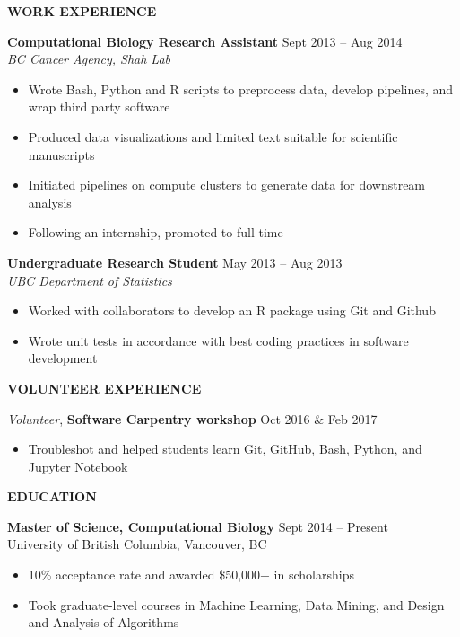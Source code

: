 \documentclass{res}
\renewcommand{\section}[1]{%
  \vspace{0.3in}%
  \centerline{\uppercase{\bf{#1}}}%
  \vspace{-6pt}}
\newcommand{\linehead}[2]{%
  {\bf #1} \hfill #2\\}
\newcommand{\linevolunteer}[3]{%
  {\sl #3}, {\bf #2} \hfill #1}%
\begin{document}
\begin{resume}
\section{Work Experience}

{\bf Computational Biology Research Assistant} \hfill Sept 2013 -- Aug 2014\\
{\it BC Cancer Agency, Shah Lab}
\begin{itemize}
  \item Wrote Bash, Python and R scripts to preprocess data, develop pipelines, and wrap third party software
  \item Produced data visualizations and limited text suitable for scientific manuscripts
  \item Initiated pipelines on compute clusters to generate data for downstream analysis
  \item Following an internship, promoted to full-time
\end{itemize}

{\bf Undergraduate Research Student} \hfill May 2013 -- Aug 2013\\
{\it UBC Department of Statistics}
\begin{itemize}
  \item Worked with collaborators to develop an R package using Git and Github
  \item Wrote unit tests in accordance with best coding practices in software development
\end{itemize}

\section{Volunteer experience}
\linevolunteer{Oct 2016 \& Feb 2017}{%
  Software Carpentry workshop}{%
  Volunteer}
\begin{itemize}
  \item Troubleshot and helped students learn Git, GitHub, Bash, Python, and Jupyter Notebook
\end{itemize}

\section{Education}
\linehead{Master of Science, Computational Biology}{Sept 2014 -- Present}
University of British Columbia, Vancouver, BC
\begin{itemize}
  \item 10\% acceptance rate and awarded \$50,000+ in scholarships
  \item Took graduate-level courses in Machine Learning, Data Mining, and Design and Analysis of Algorithms
\end{itemize}
\pagebreak

\end{resume}
\end{document}
